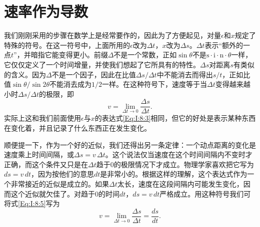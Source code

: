 \documentclass[12pt,oneside]{book}
\begin{document}
\section{速率作为导数}
我们刚刚采用的步骤在数学上是经常要作的，因此为了方便起见，对量$\epsilon$和$x$规定了特殊的符号。在这一符号中，上面所用的$\epsilon$改为$\Delta t$，$x$改为$\Delta s$。$\Delta t$表示“额外的一点$t$”，并暗指它能变得更小。前缀$\Delta$不是一个常数，正如$\sin \theta$不是$\text{s}\cdot\text{i}\cdot\text{n}\cdot\theta$一样，它仅仅定义了一个时间增量，并使我们想起了它所具有的特性。$\Delta s$对距离$s$有类似的含义。因为$\Delta$不是一个因子，因此在比值$\Delta s/\Delta t$中不能消去而得出$s/t$，正如比值$\sin\theta/\sin2\theta$不能消去成为$1/2$一样。在这种符号下，速度等于当$\Delta t$变得越来越小时$\Delta s/\Delta t$的极限，即
\begin{equation}
\label{Eq:I:8:5}
v=\lim_{\Delta t\to0}\frac{\Delta s}{\Delta t}.
\end{equation}
实际上这和我们前面使用$\epsilon$与$x$的表达式\eqref{Eq:I:8:3}相同，但它的好处是表示某种东西在变化着，并且记录了什么东西正在发生变化。

顺便提一下，作为一个好的近似，我们还得出另一条定律：一个动点距离的变化是速度乘上时间间隔，或$\Delta s=v\,\Delta t$。这个说法仅当速度在这个时间间隔内不变时才正确，而这个条件又只是在$\Delta t$趋于0的极限情况下才成立。物理学家喜欢把它写为$ds=v\,dt$，因为按他们的意思$dt$是非常小的。根据这样的理解，这个表达式作为一个非常接近的近似是成立的。如果$\Delta t$太长，速度在这段间隔内可能发生变化，因而这个近似就欠佳了。对趋于0的时间$dt$，$ds=v\,dt$严格成立。用这种符号我们可将式\eqref{Eq:I:8:5}写为
\begin{equation*}
v=\lim_{\Delta t\to0}\frac{\Delta s}{\Delta t}=\frac{ds}{dt}.
\end{equation*}
\end{document}
